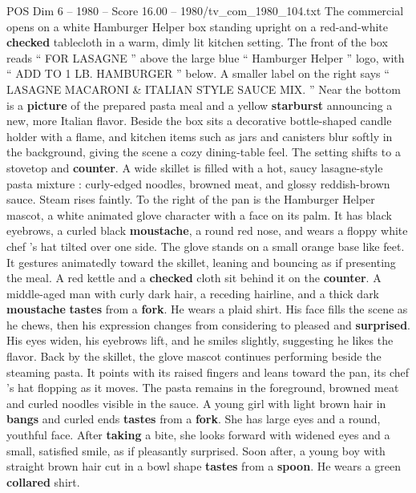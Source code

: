 \begin{textsample}{POS Dim 6 – 1980 – Score 16.00 – 1980/tv\_com\_1980\_104.txt}  \label{ex:f6_pos_033}
The commercial opens on a white Hamburger Helper box standing upright on a red-and-white \textbf{checked} tablecloth in a warm, dimly lit kitchen setting.
The front of the box reads “ FOR LASAGNE ” above the large blue “ Hamburger Helper ” logo, with “ ADD TO 1 LB.
HAMBURGER ” below.
A smaller label on the right says “ LASAGNE MACARONI \& ITALIAN STYLE SAUCE MIX. ” Near the bottom is a \textbf{picture} of the prepared pasta meal and a yellow \textbf{starburst} announcing a new, more Italian flavor.
Beside the box sits a decorative bottle-shaped candle holder with a flame, and kitchen items such as jars and canisters blur softly in the background, giving the scene a cozy dining-table feel.
The setting shifts to a stovetop and \textbf{counter}.
A wide skillet is filled with a hot, saucy lasagne-style pasta mixture : curly-edged noodles, browned meat, and glossy reddish-brown sauce.
Steam rises faintly.
To the right of the pan is the Hamburger Helper mascot, a white animated glove character with a face on its palm.
It has black eyebrows, a curled black \textbf{moustache}, a round red nose, and wears a floppy white chef ’s hat tilted over one side.
The glove stands on a small orange base like feet.
It gestures animatedly toward the skillet, leaning and bouncing as if presenting the meal.
A red kettle and a \textbf{checked} cloth sit behind it on the \textbf{counter}.
A middle-aged man with curly dark hair, a receding hairline, and a thick dark \textbf{moustache} \textbf{tastes} from a \textbf{fork}.
He wears a plaid shirt.
His face fills the scene as he chews, then his expression changes from considering to pleased and \textbf{surprised}.
His eyes widen, his eyebrows lift, and he smiles slightly, suggesting he likes the flavor.
Back by the skillet, the glove mascot continues performing beside the steaming pasta.
It points with its raised fingers and leans toward the pan, its chef ’s hat flopping as it moves.
The pasta remains in the foreground, browned meat and curled noodles visible in the sauce.
A young girl with light brown hair in \textbf{bangs} and curled ends \textbf{tastes} from a \textbf{fork}.
She has large eyes and a round, youthful face.
After \textbf{taking} a bite, she looks forward with widened eyes and a small, satisfied smile, as if pleasantly surprised.
Soon after, a young boy with straight brown hair cut in a bowl shape \textbf{tastes} from a \textbf{spoon}.
He wears a green \textbf{collared} shirt.

\end{textsample}
